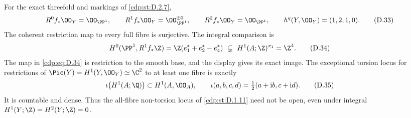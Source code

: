 
\begin{proposition}\label{cdp:st:D.2.8}

For the exact threefold and markings of \ref{cdp:st:D.2.7},
\[
 R^0f_*\OO_Y=\OO_{\PP^1},\qquad
 R^1f_*\OO_Y=\OO_{\PP^1}^{\oplus2},\qquad
 R^2f_*\OO_Y=\OO_{\PP^1},
 \qquad h^q(Y,\OO_Y)=(1,2,1,0).
\tag{D.33}\label{cdp:eq:D.33}
\]
The coherent restriction map to every full fibre is surjective.
The integral comparison is
\[
 H^0(\PP^1,R^1f_*\Z)
   =\Z(e_1^*+e_2^*-e_4^*)
   \ \subsetneq\ H^1(A;\Z)^{\pi_1}=\Z^4.
\tag{D.34}\label{cdp:eq:D.34}
\]
The map in \eqref{cdp:eq:D.34} is restriction to the smooth base, and the
display gives its exact image. The exceptional torsion locus
for restrictions of $\Pic(Y)=H^1(Y,\OO_Y)\simeq\C^2$ to
at least one fibre is exactly
\[
 \iota\bigl(H^1(A;\Q)\bigr)\subset H^1(A,\OO_A),
 \qquad
 \iota(a,b,c,d)=\tfrac12(a+\mathrm i b,c+\mathrm i d).
\tag{D.35}\label{cdp:eq:D.35}
\]
It is countable and dense. Thus the all-fibre non-torsion locus
of \ref{cdp:st:D.1.11} need not be open, even under integral
$H^1(Y;\Z)=H^2(Y;\Z)=0$.
\end{proposition}
